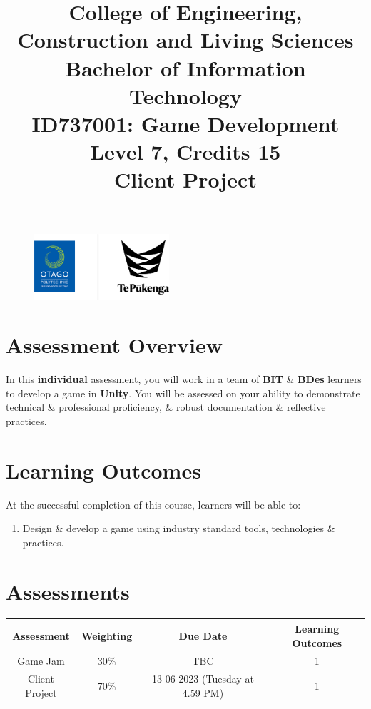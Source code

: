 \documentclass{article}
\author{}
\begin{document}
 

\begin{figure}
	\centering
	\includegraphics[width=50mm]{../../resources/img/logo.png}
\end{figure}

\title{College of Engineering, Construction and Living Sciences\\Bachelor of Information Technology\\ID737001: Game Development\\Level 7, Credits 15\\\textbf{Client Project}}
\date{}
\maketitle

\section*{Assessment Overview}
In this \textbf{individual} assessment, you will work in a team of \textbf{BIT} \& \textbf{BDes} learners to develop a game in \textbf{Unity}. You will be assessed on your ability to demonstrate technical \& professional proficiency, \& robust documentation \& reflective practices.

\section*{Learning Outcomes}
At the successful completion of this course, learners will be able to:
\begin{enumerate}
	\item Design \& develop a game using industry standard tools, technologies \& practices.
\end{enumerate}

\section*{Assessments}
\renewcommand{\arraystretch}{1.5}
\begin{tabular}{|c|c|c|c|}
	\hline
	\textbf{Assessment}                                 & \textbf{Weighting} & \textbf{Due Date}            & \textbf{Learning Outcomes} \\ \hline
	\small Game Jam  & \small 30\%        & \small TBC   & \small 1                   \\ \hline
	\small Client Project & \small 70\%        & \small 13-06-2023 (Tuesday at 4.59 PM)   & \small 1                   \\ \hline
\end{tabular} 
\end{document}
